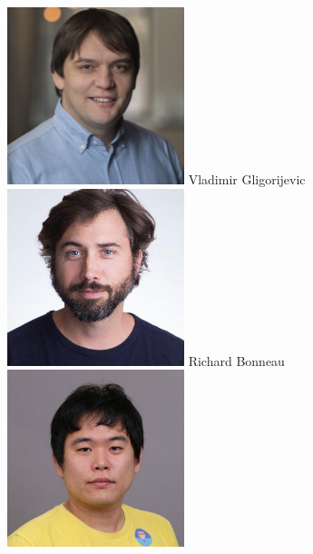 \documentclass{beamer}
\begin{document}
\begin{frame}
\begin{columns}
    \includegraphics[width=0.8\columnwidth]{vlad.png}
    Vladimir Gligorijevic
    \includegraphics[width=0.8\columnwidth]{rich.png}
    Richard Bonneau
    \includegraphics[width=0.8\columnwidth]{kyunghyun.png}

\end{columns}
\end{frame}
\end{document}
